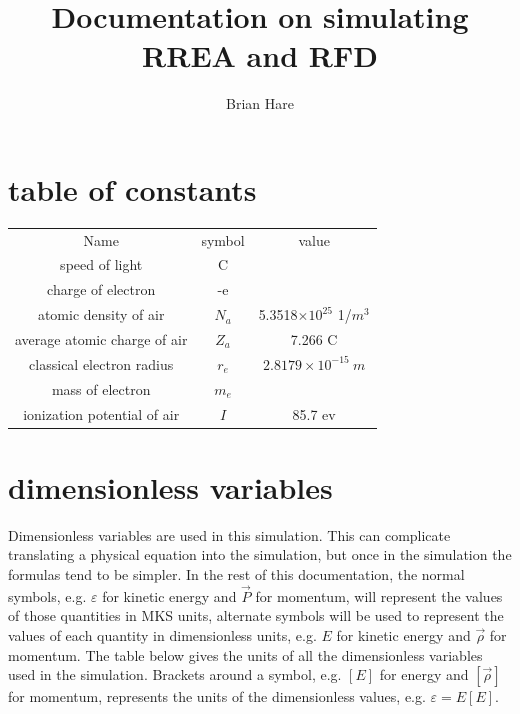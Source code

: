 \documentclass[]{article}
\title{Documentation on simulating RREA and RFD}
\author{Brian Hare}
\begin{document}
\maketitle



\section{table of constants}

\begin{center}
	\begin{tabular}{ c c c }
		Name                            & symbol    &   value  \\ 
		speed of light                  & C         &         \\  
		charge of electron              & -e        &         \\  
		atomic density of air           & $N_a$     &  5.3518$\times10^{25}$ 1/$m^3$     \\  
		average atomic charge of air    & $Z_a$     &  7.266 C \\  
		classical electron radius       & $r_e$     &   $2.8179\times 10^{-15}\ m $      \\  
        mass of electron                & $m_e$     &     \\
        ionization potential of air   & $I$       &  85.7 ev    \\  
	\end{tabular}
\end{center}


\section{dimensionless variables}

Dimensionless variables are used in this simulation. This can complicate translating a physical equation into the simulation, but once in the simulation the formulas tend to be simpler. In the rest of this documentation, the normal symbols, e.g. $\varepsilon$ for kinetic energy and $ \vec{P} $ for momentum, will represent the values of those quantities in MKS units, alternate symbols will be used to represent the values of each quantity in dimensionless units, e.g. $E$ for kinetic energy and $\vec{\rho} $ for momentum. The table below gives the units of all the dimensionless variables used in the simulation. Brackets around a symbol, e.g.  $\left[ E\right] $ for energy and $\left[  \vec{\rho} \right] $ for momentum, represents the units of the dimensionless values, e.g. $\varepsilon = E \left[ E \right] $.
\end{document}
